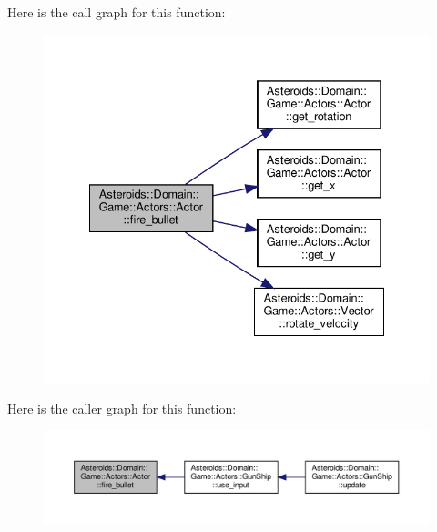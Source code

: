 Here is the call graph for this function\+:\nopagebreak
\begin{figure}[H]
\begin{center}
\leavevmode
\includegraphics[width=335pt]{classAsteroids_1_1Domain_1_1Game_1_1Actors_1_1Actor_ad108a838180454ac98facde4518d7660_cgraph}
\end{center}
\end{figure}
Here is the caller graph for this function\+:\nopagebreak
\begin{figure}[H]
\begin{center}
\leavevmode
\includegraphics[width=350pt]{classAsteroids_1_1Domain_1_1Game_1_1Actors_1_1Actor_ad108a838180454ac98facde4518d7660_icgraph}
\end{center}
\end{figure}
\mbox{\label{classAsteroids_1_1Domain_1_1Game_1_1Actors_1_1Actor_a85f975b2236c7615a1db179cfe7694f0}} 
